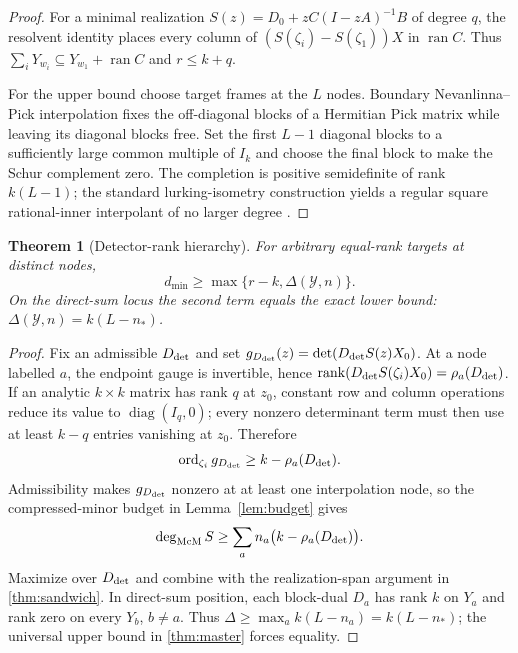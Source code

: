 \documentclass[11pt]{article}
\newtheorem{theorem}{Theorem}[section]
\theoremstyle{definition}\newtheorem{definition}[theorem]{Definition}\newtheorem{example}[theorem]{Example}
\theoremstyle{remark}\newtheorem{remark}[theorem]{Remark}\newtheorem{limitation}[theorem]{Limitation}
\newcommand{\ran}{\operatorname{ran}}\newcommand{\Span}{\operatorname{span}}
\newcommand{\rank}{\operatorname{rank}}
\newcommand{\mcdeg}{\deg_{\mathrm{McM}}}\newcommand{\A}{\mathcal A}
\begin{document}
\begin{proof}
For a minimal realization $S(z)=D_0+zC(I-zA)^{-1}B$ of degree $q$, the
resolvent identity places every column of
$(S(\zeta_i)-S(\zeta_1))X$ in $\ran C$.  Thus
$\sum_iY_{w_i}\subseteq Y_{w_1}+\ran C$ and $r\le k+q$.

For the upper bound choose target frames at the $L$ nodes.  Boundary
Nevanlinna--Pick interpolation fixes the off-diagonal blocks of a Hermitian
Pick matrix while leaving its diagonal blocks free.  Set the first $L-1$
diagonal blocks to a sufficiently large common multiple of $I_k$ and choose
the final block to make the Schur complement zero.  The completion is
positive semidefinite of rank $k(L-1)$; the standard lurking-isometry
construction yields a regular square rational-inner interpolant of no
larger degree \cite{BallKim1994,BolotnikovDym2006}.
\end{proof}

\begin{theorem}[Detector-rank hierarchy]\label{thm:detector-rank}
For arbitrary equal-rank targets at distinct nodes,
\begin{equation}\label{eq:detector-rank-bound}
 \boxed{\qquad d_{\min}\ge
 \max\{r-k,\Delta(\mathcal Y,n)\}.\qquad}
\end{equation}
On the direct-sum locus the second term equals the exact lower bound:
$\Delta(\mathcal Y,n)=k(L-n_*)$.
\end{theorem}

\begin{proof}
Fix an admissible $D_{\rm det}$ and set
$g_{D_{\rm det}}(z)=\det(D_{\rm det} S(z)X_0)$.  At a node labelled
$a$, the endpoint gauge is invertible, hence
$\rank(D_{\rm det} S(\zeta_i)X_0)=\rho_a(D_{\rm det})$.  If an analytic
$k\times k$ matrix has rank $q$ at $z_0$, constant row and column operations reduce its value to
$\operatorname{diag}(I_q,0)$; every nonzero determinant term must then use
at least $k-q$ entries vanishing at $z_0$.  Therefore
\[
 \operatorname{ord}_{\zeta_i}g_{D_{\rm det}}\ge k-\rho_a(D_{\rm det}).
\]
Admissibility makes $g_{D_{\rm det}}$ nonzero at at least one interpolation
node, so the compressed-minor budget in Lemma~\ref{lem:budget} gives
\[
 \mcdeg S\ge\sum_a n_a\bigl(k-\rho_a(D_{\rm det})\bigr).
\]
Maximize over $D_{\rm det}$ and combine with the realization-span argument in
\cref{thm:sandwich}.  In direct-sum position, each block-dual $D_a$ has rank
$k$ on $Y_a$ and rank zero on every $Y_b$, $b\ne a$.  Thus
$\Delta\ge\max_a k(L-n_a)=k(L-n_*)$; the universal upper bound in
\cref{thm:master} forces equality.
\end{proof}
\end{document}
